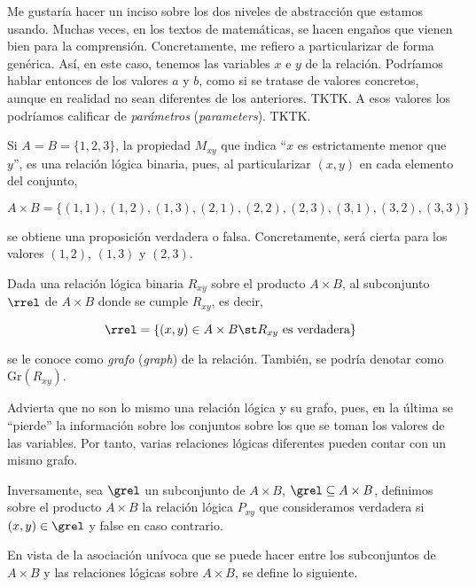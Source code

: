Me gustaría hacer un inciso sobre los dos niveles de abstracción que estamos
usando. Muchas veces, en los textos de matemáticas, se hacen engaños que
vienen bien para la comprensión. Concretamente, me refiero a particularizar
de forma genérica. Así, en este caso, tenemos las variables $x$ e $y$ de la
relación. Podríamos hablar entonces de los valores $a$ y $b$, como si se
tratase de valores concretos, aunque en realidad no sean diferentes de los
anteriores. TKTK. A esos valores los podríamos calificar de
\emph{parámetros} (\emph{parameters}). TKTK.

\begin{example}
  Si $A = B = \{1, 2, 3\}$, la propiedad $M_{xy}$ que indica ``$x$ es
  estrictamente menor que $y$'', es una relación lógica binaria, pues, al
  particularizar $(x, y)$ en cada elemento del conjunto,

  \[ A \times B = \{(1, 1), (1, 2), (1, 3), (2, 1), (2, 2), (2, 3), (3, 1),
  (3, 2), (3, 3)\} \]

  \noindent se obtiene una proposición verdadera o falsa. Concretamente,
  será cierta para los valores $(1, 2)$, $(1, 3)$ y $(2, 3)$.
\end{example}

Dada una relación lógica binaria $R_{xy}$ sobre el producto $A \times B$, al
subconjunto $\rrel$ de $A \times B$ donde se cumple $R_{xy}$, es decir,

\[ \rrel = \{(x, y) \in A \times B \st R_{xy} \ \text{es verdadera}\} \]

\noindent se le conoce como \emph{grafo} (\emph{graph}) de la relación.
También, se podría denotar como $\text{Gr}(R_{xy})$.

\iffalse
Por cierto, tal y como acabo de hacer, en la terminología que seguiremos,
hablaremos de \emph{relaciones}, en general, y se considerará, si no se
especifica otra cosa, que se trata de relaciones lógicas binarias.
\fi

Advierta que no son lo mismo una relación lógica y su grafo, pues, en la
última se ``pierde'' la información sobre los conjuntos sobre los que se
toman los valores de las variables. Por tanto, varias relaciones lógicas
diferentes pueden contar con un mismo grafo.

Inversamente, sea $\grel$ un subconjunto de $A \times B$, $\grel \subseteq A
\times B$, definimos sobre el producto $A \times B$ la relación lógica
$P_{xy}$ que consideramos verdadera si $(x, y) \in \grel$ y false en caso
contrario.

En vista de la asociación unívoca que se puede hacer entre los subconjuntos
de $A \times B$ y las relaciones lógicas sobre $A \times B$, se define lo
siguiente.

